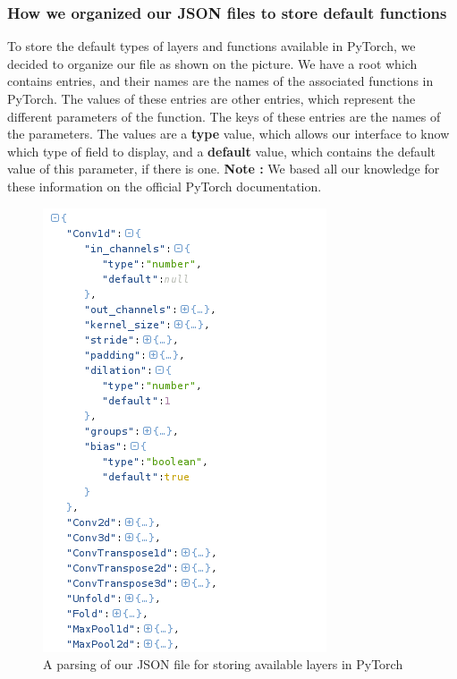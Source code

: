 \subsubsection{How we organized our JSON files to store default functions}
To store the default types of layers and functions available in PyTorch, we decided to organize our file as shown on the picture. We have a root which contains entries, and their names are the names of the associated functions in PyTorch. The values of these entries are other entries, which represent the different parameters of the function. The keys of these entries are the names of the parameters. The values are a \textbf{type} value, which allows our interface to know which type of field to display, and a \textbf{default} value, which contains the default value of this parameter, if there is one.
\newline \textbf{Note :} We based all our knowledge for these information on the official PyTorch documentation.
\begin{figure}[]
    \centering 
    \includegraphics[scale=0.7]{figures/default_layer_types.png}
    \caption{A parsing of our JSON file for storing available layers in PyTorch}
\end{figure}


